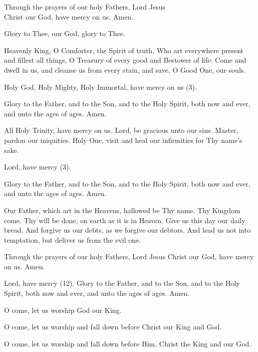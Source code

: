 \begin{center}
Through the prayers of our holy Fathers, Lord Jesus\\Christ our God, have mercy on us. Amen.

Glory to Thee, our God, glory to Thee.
\end{center}

Heavenly King, O Comforter, the Spirit of truth, Who art everywhere present and fillest all things, O Treasury of every good and Bestower of life: Come and dwell in us, and cleanse us from every stain, and save, O Good One, our souls.

\begin{hangparas}{.25in}{1}
Holy God, Holy Mighty, Holy Immortal, have mercy on us (3).

Glory to the Father, and to the Son, and to the Holy Spirit, both now and ever, and unto the ages of ages. Amen.
\end{hangparas}

All Holy Trinity, have mercy on us. Lord, be gracious unto our sins. Master, pardon our iniquities. Holy One, visit and heal our infirmities for Thy name's sake.

\begin{center}
Lord, have mercy (3).
\end{center}

\begin{hangparas}{.25in}{1}
Glory to the Father, and to the Son, and to the Holy Spirit, both now and ever, and unto the ages of ages. Amen.
\end{hangparas}

Our Father, which art in the Heavens, hallowed be Thy name. Thy Kingdom come. Thy will be done, on earth as it is in Heaven. Give us this day our daily bread. And forgive us our debts, as we forgive our debtors. And lead us not into temptation, but deliver us from the evil one.

\begin{hangparas}{.25in}{1}
Through the prayers of our holy Fathers, Lord Jesus Christ our God, have mercy on us. Amen.

Lord, have mercy (12). Glory to the Father, and to the Son, and to the Holy Spirit, both now and ever, and unto the ages of ages. Amen.

O come, let us worship God our King.

O come, let us worship and fall down before Christ our King and God.

O come, let us worship and fall down before Him, Christ the King and our God.
\end{hangparas}

